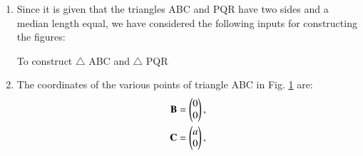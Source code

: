 \renewcommand{\theequation}{\theenumi}
\begin{enumerate}[label=\thesection.\arabic*.,ref=\thesection.\theenumi]

\begin{figure}[!ht]
\centering
\resizebox{\columnwidth}{!}{}
\caption{$\triangle ABC$ and $\triangle PQR$ by Latex-Tikz}
\label{fig:triangle_latex}	
\end{figure}
%
%
%
\item Since it is given that the triangles ABC and PQR have two sides and a median length equal, we have considered the following inputs for constructing the figures:
\\
%
\begin{table}[ht!]
\centering

\caption{To construct $\triangle $ ABC and $\triangle$ PQR}
\label{table:table1}	
\end{table}


\item The coordinates of the various points of triangle ABC in Fig. \ref{fig:triangle_latex} are:
\\
%
\begin{align}
\mathbf{B} &= \begin{pmatrix}0\\0\end{pmatrix} ,
\label{eq:constr_b}
\\
 \mathbf{C} &= \begin{pmatrix}a\\0\end{pmatrix}, 
\label{eq:constr_c}
\end{align}


\end{enumerate}
